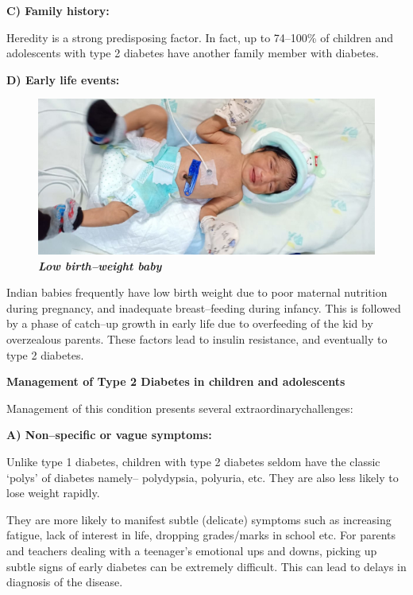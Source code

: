 \noindent\textbf{C) Family history:}

Heredity is a strong predisposing factor. In fact, up to 74–100\% of children and adolescents with type 2 diabetes have another family member with diabetes.



\noindent\textbf{D) Early life events:}

\begin{figure}[h]
\centering
\includegraphics[scale=1.2]{images/025.jpg}\\
\small\textbf{\textit{Low birth–weight baby}}
\end{figure}

Indian babies frequently have low birth weight due to poor maternal nutrition during pregnancy, and inadequate breast–feeding during infancy. This is followed by a phase of catch–up growth in early life due to overfeeding of the kid by overzealous parents. These factors lead to insulin resi\-stance, and eventually to type 2 diabetes.

\noindent\textbf{Management of Type 2 Diabetes in children and adolescents}

Management of this condition presents several extraordinary\break challenges:

\noindent\textbf{A) Non–specific or vague symptoms:}

Unlike type 1 diabetes, children with type 2 diabetes seldom have the classic ‘polys’ of diabetes namely– polydypsia, polyuria, etc. They are also less likely to lose weight rapidly.

They are more likely to manifest subtle (delicate) symptoms such as increasing fatigue, lack of interest in life, dropping grades/marks in school etc. For parents and teachers dealing with a teenager’s emotional ups and downs, picking up subtle signs of early diabetes can be extremely difficult. This can lead to delays in diagnosis of the disease.


